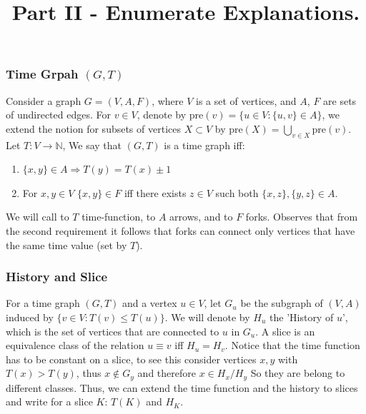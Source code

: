\documentclass{beamer}
\begin{document}
\begin{frame}

  \title{Part II - Enumerate Explanations. }
    \titlepage


\end{frame}

\newcommand{\History}[1]{H_{#1}}
  \newcommand{\Time}[1]{T(#1)}
  \newcommand{\Excuse}[1]{\mathbf{Excuse}(#1)}
  \newcommand{\Excusei}[1]{\mathbf{Excuse}_{i}(#1)}
  \newcommand{\Size}[1]{\mathbf{Size}(#1)}
  \newcommand{\Span}[1]{\mathbf{Span}(#1)}
  \newcommand{\pre}[1]{\text{pre}(#1)}
  \newcommand{\prei}[1]{\text{pre}_{i}(#1)}

\begin{frame}
  \frametitle{ Time Grpah $(G,T)$} 

    Consider a graph $G = (V, A, F)$, where $V$ is a set of vertices, and $A$, $F$ are sets of undirected edges. For $v \in V$, denote by $\pre{v} = \{ u \in V : \{u,v\} \in A \}$, we extend the notion for subsets of vertices $X \subset V$ by $\pre{X} = \bigcup_{v \in X} \pre{v}$. Let $ T : V \rightarrow \mathbb{N}$, We say that $(G,T)$ is a time graph iff:
\begin{enumerate}
  \item $\{x,y\} \in A \Rightarrow \Time{y} = \Time{x} \pm 1$  
  \item For $x,y \in V $  $\{x,y\} \in F $ iff there exists $z \in V $ such both $\{x,z\},\{y,z\} \in A$. 
\end{enumerate} We will call to $T$ time-function, to $A$ arrows, and to $F$ forks. Observes that from the second requirement it follows that forks can connect only vertices that have the same time value (set by $T$). 
\end{frame}

\begin{frame}
  \frametitle{History and Slice} 

    For a time graph $(G,T)$ and a vertex $u \in V$, let $G_{u}$ be the subgraph of $(V,A)$ induced by $\{ v \in V : \Time{v} \le \Time{u} \}$. We will denote by $\History{u}$ the 'History of $u$', which is the set of vertices that are connected to $u$ in $G_{u}$. A slice is an equivalence class of the relation $u \equiv v$ iff $\History{u} = \History{v}$. Notice that the time function has to be constant on a slice, to see this consider vertices  $x,y$ with $T(x) > T(y)$, thus $x \notin G_{y}$ and therefore $x \in \History{x}/\History{y}$ So they are belong to different classes. Thus, we can extend the time function and the history to slices and write for a slice $K$: $\Time{K}$ and $\History{K}$.
\end{frame}
\end{document}
